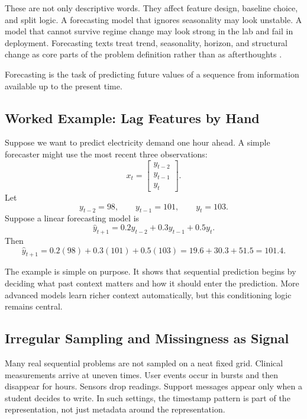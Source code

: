 These are not only descriptive words. They affect feature design, baseline choice, and split logic. A forecasting model that ignores seasonality may look unstable. A model that cannot survive regime change may look strong in the lab and fail in deployment.
Forecasting texts treat trend, seasonality, horizon, and structural change as core parts of the problem definition rather than as afterthoughts \citep{hyndman2021}.

\begin{definition}[Forecasting]
Forecasting is the task of predicting future values of a sequence from information available up to the present time.
\end{definition}

\subsection{Worked Example: Lag Features by Hand}

Suppose we want to predict electricity demand one hour ahead. A simple forecaster might use the most recent three observations:
\[
x_t =
\begin{bmatrix}
y_{t-2} \\
y_{t-1} \\
y_t
\end{bmatrix}.
\]
Let
\[
y_{t-2}=98,\qquad y_{t-1}=101,\qquad y_t=103.
\]
Suppose a linear forecasting model is
\[
\hat{y}_{t+1} = 0.2y_{t-2} + 0.3y_{t-1} + 0.5y_t.
\]
Then
\[
\hat{y}_{t+1} = 0.2(98) + 0.3(101) + 0.5(103) = 19.6 + 30.3 + 51.5 = 101.4.
\]

The example is simple on purpose. It shows that sequential prediction begins by deciding what past context matters and how it should enter the prediction. More advanced models learn richer context automatically, but this conditioning logic remains central.

\subsection{Irregular Sampling and Missingness as Signal}

Many real sequential problems are not sampled on a neat fixed grid. Clinical measurements arrive at uneven times. User events occur in bursts and then disappear for hours. Sensors drop readings. Support messages appear only when a student decides to write. In such settings, the timestamp pattern is part of the representation, not just metadata around the representation.

